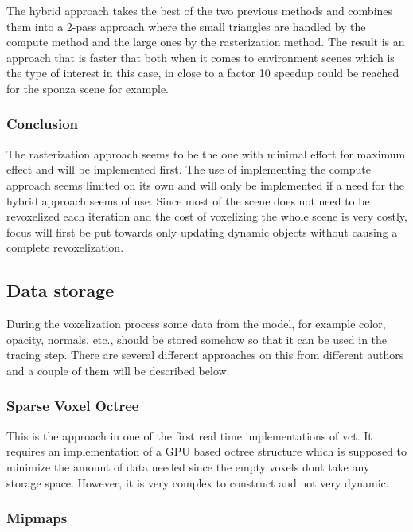\documentclass[a4paper, 12pt]{article}
\begin{document}
The hybrid approach takes the best of the two previous methods and combines them into a 2-pass approach where the small triangles are handled by the compute method and the large ones by the rasterization method. The result is an approach that is faster that both when it comes to environment scenes which is the type of interest in this case, in \cite{phdthesis} close to a factor 10 speedup could be reached for the sponza scene for example.

\subsubsection{Conclusion}

The rasterization approach seems to be the one with minimal effort for maximum effect and will be implemented first. The use of implementing the compute approach seems limited on its own and will only be implemented if a need for the hybrid approach seems of use. Since most of the scene does not need to be revoxelized each iteration and the cost of voxelizing the whole scene is very costly, focus will first be put towards only updating dynamic objects without causing a complete revoxelization.

\subsection{Data storage}

During the voxelization process some data from the model, for example color, opacity, normals, etc., should be stored somehow so that it can be used in the tracing step. There are several different approaches on this from different authors and a couple of them will be described below.

\subsubsection{Sparse Voxel Octree}

This is the approach in one of the first real time implementations of \gls{vct}. It requires an implementation of a GPU based octree structure which is supposed to minimize the amount of data needed since the empty voxels dont take any storage space. However, it is very complex to construct and not very dynamic.

\subsubsection{Mipmaps}
\end{document}
